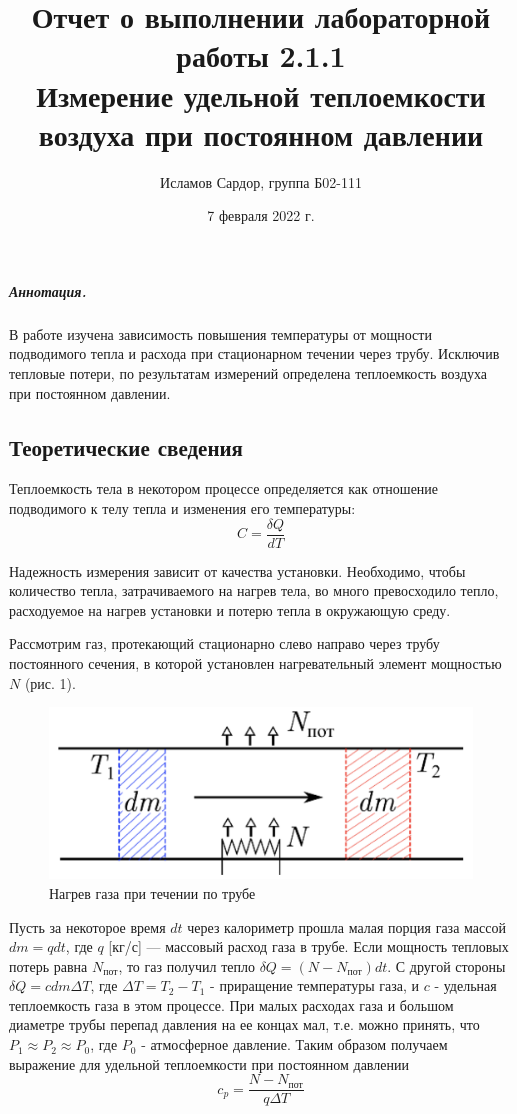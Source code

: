 \documentclass[12pt,a4paper]{article}
\title{
Отчет о выполнении лабораторной работы 2.1.1 \\
Измерение удельной теплоемкости воздуха при постоянном давлении}
\author{Исламов Сардор, группа Б02-111}
\date{7 февраля 2022 г. }
\begin{document}
\maketitle

\subparagraph*{Аннотация.}
В работе изучена зависимость повышения температуры от мощности подводимого тепла и расхода при стационарном течении через трубу. Исключив тепловые потери, по результатам измерений определена теплоемкость воздуха при постоянном давлении.

\subsection*{Теоретические сведения}
Теплоемкость тела в некотором процессе определяется как отношение подводимого к телу тепла и изменения его температуры:
\begin{equation}
    C = \frac {\delta Q} {dT}
\end{equation}

Надежность измерения зависит от качества установки. Необходимо, чтобы количество тепла, затрачиваемого на нагрев тела, во много превосходило тепло, расходуемое на нагрев установки и потерю тепла в окружающую среду.

Рассмотрим газ, протекающий стационарно слево направо через трубу постоянного сечения, в которой установлен нагревательный элемент мощностью $N$ (рис. 1).
\begin{figure}[htp]
\centering
    \includegraphics[width=0.5\linewidth]{1.png}
    \caption{Нагрев газа при течении по трубе}
    \label{fig:my_label}
\end{figure}

Пусть за некоторое время $dt$ через калориметр прошла малая порция газа массой $dm=q dt$, где $q$ [кг/с] — массовый расход газа в трубе. Если мощность тепловых потерь равна $N_{пот}$, то газ получил тепло $\delta Q=(N-N_{пот})dt$. С другой стороны $\delta Q = cdm \Delta T$, где $\Delta T = T_2-T_1$ - приращение температуры газа, и $c$ - удельная теплоемкость газа в этом процессе. При малых расходах газа и большом диаметре трубы перепад давления на ее концах мал, т.е. можно принять, что $P_1\approx P_2 \approx P_0$, где $P_0$ - атмосферное давление. Таким образом получаем выражение для удельной теплоемкости при постоянном давлении 
\begin{equation}
    c_p=\frac{N-N_{пот}}{q\Delta T}
\end{equation}
\end{document}

